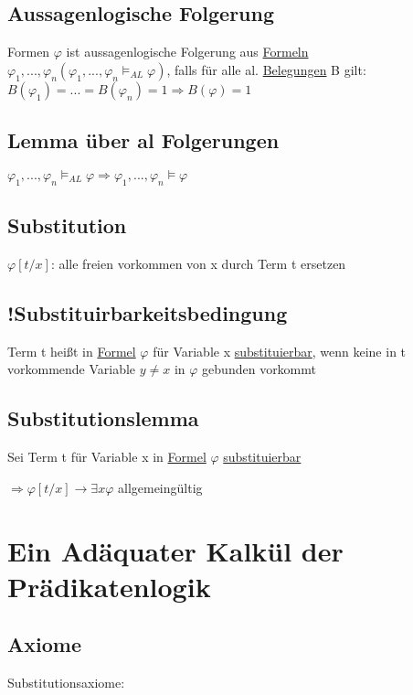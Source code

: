 \documentclass[12pt,a4paper]{article} %
\begin{document}
	\subsection{Aussagenlogische Folgerung}
	Formen $\varphi$ ist aussagenlogische Folgerung aus \hyperref[Formel]{Formeln} \newline 
	$\varphi_1, ..., \varphi_n (\varphi_1, ..., \varphi_n \hyperref[Erfullbar]{\vDash_{AL}} \varphi)$, falls für alle al. \hyperref[Belegung]{Belegungen} B gilt: \newline
	$B(\varphi_1) = ... = B(\varphi_n) = 1 \Rightarrow B(\varphi) = 1$
	
	\subsection{Lemma über al Folgerungen}
	$\varphi_1, ..., \varphi_n \hyperref[Erfullbar]{\vDash_{AL}} \varphi \Rightarrow \varphi_1, ..., \varphi_n \hyperref[Erfullbar]{\vDash} \varphi$
	
	\subsection{Substitution}
	\label{Substituierbar}
	$\varphi[t/x]$: alle freien vorkommen von x durch Term t ersetzen
	
	\subsection{!Substituirbarkeitsbedingung}
	Term t heißt in \hyperref[Formel]{Formel} $\varphi$ für Variable x \hyperref[Substituierbar]{substituierbar}, wenn keine in t vorkommende Variable $y \ne x$ in $\varphi$ gebunden vorkommt
	
	\subsection{Substitutionslemma}
	Sei Term t für Variable x in \hyperref[Formel]{Formel} $\varphi$ \hyperref[Substituierbar]{substituierbar} 
	
	$\Rightarrow \varphi[t/x] \rightarrow \exists x \varphi$ allgemeingültig
	
	\section{Ein Adäquater Kalkül der Prädikatenlogik}
	
	\subsection{Axiome}
	Substitutionsaxiome:
	
\end{document}

